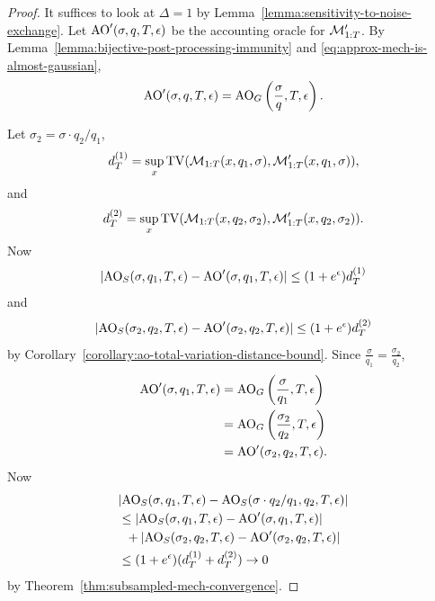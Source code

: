 \documentclass{article}
\theoremstyle{plain}
\theoremstyle{definition}
\theoremstyle{remark}
\begin{document}
\begin{proof}
    It suffices to look at $\Delta = 1$ by Lemma~\ref{lemma:sensitivity-to-noise-exchange}.
    Let $\mathrm{AO}'(\sigma, q, T, \epsilon)$ be the accounting oracle for $\mathcal{M}_{1:T}'$.
    By Lemma~\ref{lemma:bijective-post-processing-immunity} and \eqref{eq:approx-mech-is-almost-gaussian},
    \begin{equation}
        \mathrm{AO}'(\sigma, q, T, \epsilon) = \mathrm{AO}_G\left(\frac{\sigma}{q}, T, \epsilon\right).\label{eq:approx-mech-is-almost-gaussian-ao}
    \end{equation}

    Let $\sigma_2 = \sigma \cdot q_2 / q_1$,
    \begin{equation}
        d_T^{(1)} = \sup_x\mathrm{TV}(\mathcal{M}_{1:T}(x, q_1, \sigma), \mathcal{M}'_{1:T}(x, q_1, \sigma)),
    \end{equation}
    and 
    \begin{equation}
        d_T^{(2)} = \sup_x\mathrm{TV}(\mathcal{M}_{1:T}(x, q_2, \sigma_2), \mathcal{M}'_{1:T}(x, q_2, \sigma_2)).
    \end{equation}
    Now
    \begin{equation}
        |\mathrm{AO}_S(\sigma, q_1, T, \epsilon) - \mathrm{AO}'(\sigma, q_1, T, \epsilon)|
        \leq (1 + e^\epsilon)d_T^{(1)}
    \end{equation}
    and
    \begin{equation}
        |\mathrm{AO}_S(\sigma_2, q_2, T, \epsilon) - \mathrm{AO}'(\sigma_2, q_2, T, \epsilon)|
        \leq (1 + e^\epsilon)d_T^{(2)}
    \end{equation}
    by Corollary~\ref{corollary:ao-total-variation-distance-bound}.
    Since $\frac{\sigma}{q_1} = \frac{\sigma_2}{q_2}$,
    \begin{equation}
        \begin{split}
            \mathrm{AO}'(\sigma, q_1, T, \epsilon) 
            &= \mathrm{AO}_G\left(\frac{\sigma}{q_1}, T, \epsilon\right)
            \\&= \mathrm{AO}_G\left(\frac{\sigma_2}{q_2}, T, \epsilon\right)
            \\&= \mathrm{AO}'(\sigma_2, q_2, T, \epsilon).
        \end{split}
    \end{equation}
    Now 
    \begin{equation}
        \begin{split}
            &|\mathrm{AO}_S(\sigma, q_1, T, \epsilon) - \mathrm{AO}_S(\sigma\cdot q_2 / q_1, q_2, T, \epsilon)| 
            \\&\leq|\mathrm{AO}_S(\sigma, q_1, T, \epsilon) - \mathrm{AO}'(\sigma, q_1, T, \epsilon)| 
            \\&\phantom{x}+|\mathrm{AO}_S(\sigma_2, q_2, T, \epsilon) - \mathrm{AO}'(\sigma_2, q_2, T, \epsilon)| 
            \\&\leq (1 + e^\epsilon)(d_T^{(1)} + d_T^{(2)})
            \to 0
        \end{split}
    \end{equation}
    by Theorem~\ref{thm:subsampled-mech-convergence}.
\end{proof}
\end{document}
